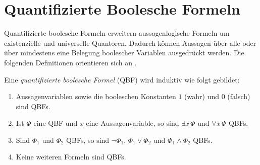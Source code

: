 \section{Quantifizierte Boolesche Formeln}
\label{sec:qbf}

Quantifizierte boolesche Formeln erweitern aussagenlogische Formeln um
existenzielle und universelle Quantoren. Dadurch können Aussagen über alle
oder über mindestens eine Belegung boolescher Variablen ausgedrückt werden.
Die folgenden Definitionen orientieren sich an \citeauthor*{handbook-satisfiability-2nd} \cite{handbook-satisfiability-2nd}.

\begin{Definition}
    \label{def:qbf}
    Eine \emph{quantifizierte boolesche Formel} (QBF) wird induktiv
    wie folgt gebildet:
    \begin{enumerate}
        \item Aussagenvariablen sowie die booleschen Konstanten
        \(1\) (wahr) und \(0\) (falsch) sind QBFs.
        \item Ist \(\varPhi\) eine QBF und \(x\) eine Aussagenvariable,
        so sind \(\exists x\,\varPhi\) und \(\forall x\,\varPhi\) QBFs.
        \item Sind \(\varPhi_1\) und \(\varPhi_2\) QBFs, so sind
        \(\neg\varPhi_1\), \(\varPhi_1\lor\varPhi_2\) und
        \(\varPhi_1\land\varPhi_2\) QBFs.
        \item Keine weiteren Formeln sind QBFs.
    \end{enumerate}
\end{Definition}

